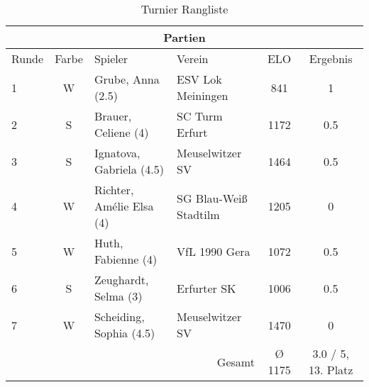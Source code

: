 \begin{table}[htbp]
\centering
\caption{Turnier Rangliste}
\begin{tabular}{|l|c|l|l|c|c|}
\hline
\multicolumn{6}{|c|}{Partien} \\
\hline
Runde & Farbe & Spieler & Verein & ELO & Ergebnis \\
\hline
1 & W & Grube, Anna (2.5) & ESV Lok Meiningen & 841 & 1 \\
2 & S & Brauer, Celiene (4) & SC Turm Erfurt & 1172 & 0.5 \\
3 & S & Ignatova, Gabriela (4.5) & Meuselwitzer SV & 1464 & 0.5 \\
4 & W & Richter, Amélie Elsa (4) & SG Blau-Weiß Stadtilm & 1205 & 0 \\
5 & W & Huth, Fabienne (4) & VfL 1990 Gera & 1072 & 0.5 \\
6 & S & Zeughardt, Selma (3) & Erfurter SK & 1006 & 0.5 \\
7 & W & Scheiding, Sophia (4.5) & Meuselwitzer SV & 1470 & 0 \\
\hline
\multicolumn{4}{|r|}{Gesamt} & Ø 1175 & 3.0 / 5, 13. Platz \\
\hline
\end{tabular}
\end{table}